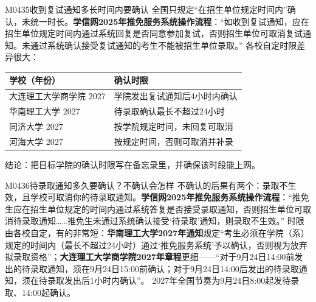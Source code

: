 \begin{qa}{M0435}{收到复试通知多长时间内要确认}
全国只规定“在招生单位规定时间内”确认，未统一时长。\textbf{学信网2025年推免服务系统操作流程}：“如收到复试通知，应在招生单位规定时间内通过系统回复是否同意参加复试，否则招生单位可取消复试通知。未通过系统确认接受复试通知的考生不能被招生单位录取。”
各校自定时限差异很大：
\par\vspace{2pt}\nobreak\begin{center}\footnotesize
\begin{tabularx}{\textwidth}{>{\raggedright\arraybackslash}X>{\raggedright\arraybackslash}X}
\toprule
\textbf{学校（年份）} & \textbf{确认时限} \\ \midrule
大连理工大学商学院 2027 & 学院发出复试通知后4小时内确认 \\
华南理工大学 2027 & 待录取确认最长不超过24小时 \\
同济大学 2027 & 按学院规定时间，未回复可取消 \\
河海大学 2027 & 按规定时间，否则可取消并补录 \\
\bottomrule
\end{tabularx}
\end{center}\vspace{2pt}\par
结论：把目标学院的确认时限写在备忘录里，并确保该时段能上网。
\end{qa}

\begin{qa}{M0436}{待录取通知多久要确认？不确认会怎样}
不确认的后果有两个：录取不生效，且学校可取消你的待录取通知。\textbf{学信网2025年推免服务系统操作流程}：“推免生应在招生单位规定的时间内通过系统答复是否接受录取通知，否则招生单位可取消待录取通知……推免生未通过系统确认接受‘待录取’通知，则录取不生效。”
时限由各校自定，有的非常短：\textbf{华南理工大学2027年通知}规定“考生必须在学院（系）规定的时间内（最长不超过24小时）通过‘推免服务系统’予以确认，否则视为放弃拟录取资格”；\textbf{大连理工大学商学院2027年章程}更细——“对于9月24日14:00前发出的待录取通知，须在9月24日15:00前确认；对于9月24日14:00后发出的待录取通知，须在待录取发出后1小时内确认”。
2027年全国节奏为9月24日8:00起发待录取、14:00起确认。
\end{qa}

